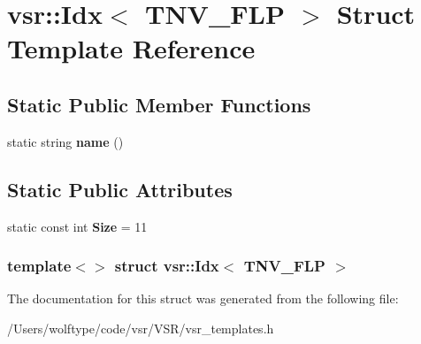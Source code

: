 \hypertarget{structvsr_1_1_idx_3_01_t_n_v___f_l_p_01_4}{\section{vsr\-:\-:Idx$<$ T\-N\-V\-\_\-\-F\-L\-P $>$ Struct Template Reference}
\label{structvsr_1_1_idx_3_01_t_n_v___f_l_p_01_4}
}
\subsection*{Static Public Member Functions}
\begin{DoxyCompactItemize}
\item 
\hypertarget{structvsr_1_1_idx_3_01_t_n_v___f_l_p_01_4_ab596c8ee7a75f6cff1aa1ca7c746d777}{static string {\bfseries name} ()}\label{structvsr_1_1_idx_3_01_t_n_v___f_l_p_01_4_ab596c8ee7a75f6cff1aa1ca7c746d777}

\end{DoxyCompactItemize}
\subsection*{Static Public Attributes}
\begin{DoxyCompactItemize}
\item 
\hypertarget{structvsr_1_1_idx_3_01_t_n_v___f_l_p_01_4_a144114bba339b8933ad1cb3442e90dd5}{static const int {\bfseries Size} = 11}\label{structvsr_1_1_idx_3_01_t_n_v___f_l_p_01_4_a144114bba339b8933ad1cb3442e90dd5}

\end{DoxyCompactItemize}
\subsubsection*{template$<$$>$ struct vsr\-::\-Idx$<$ T\-N\-V\-\_\-\-F\-L\-P $>$}



The documentation for this struct was generated from the following file\-:\begin{DoxyCompactItemize}
\item 
/\-Users/wolftype/code/vsr/\-V\-S\-R/vsr\-\_\-templates.\-h\end{DoxyCompactItemize}
